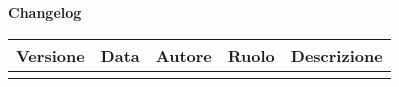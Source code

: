 \newpage
\begin{center}
	\Large{\textbf{Changelog}}
	\\\vspace{0.5cm}
	\normalsize
	\begin{tabularx}{\textwidth}{ccccX}
		\textbf{Versione} & \textbf{Data} & \textbf{Autore} & \textbf{Ruolo} &\textbf{Descrizione} 
		\\\toprule
		\modifiche
		\bottomrule
	\end{tabularx}
\end{center}

